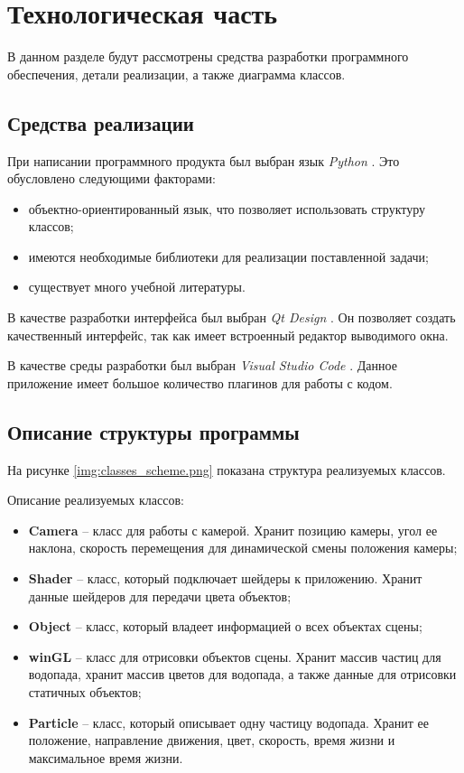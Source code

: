 \chapter{Технологическая часть}

В данном разделе будут рассмотрены средства разработки программного обеспечения, детали реализации, а также диаграмма классов.


\section{Средства реализации}

При написании программного продукта был выбран язык \textit{Python} \cite{python-lang}. Это обусловлено следующими факторами:

\begin{itemize}
    \item объектно-ориентированный язык, что позволяет использовать структуру классов;
    \item имеются необходимые библиотеки для реализации поставленной задачи;
    \item существует много учебной литературы.
\end{itemize}

В качестве разработки интерфейса был выбран \textit{Qt Design} \cite{qt-designer}. Он позволяет создать качественный интерфейс, так как имеет встроенный редактор выводимого окна.

В качестве среды разработки был выбран \textit{Visual Studio Code} \cite{vs-code}. Данное приложение имеет большое количество плагинов для работы с кодом.


\section{Описание структуры программы}

На рисунке \ref{img:classes_scheme.png} показана структура реализуемых классов.


\clearpage

Описание реализуемых классов:

\begin{itemize}
    \item \textbf{Camera} -- класс для работы с камерой. Хранит позицию камеры, угол ее наклона, скорость перемещения для динамической смены положения камеры;
    \item \textbf{Shader} -- класс, который подключает шейдеры к приложению. Хранит данные шейдеров для передачи цвета объектов;
    \item \textbf{Object} -- класс, который владеет информацией о всех объектах сцены;
    \item \textbf{winGL} -- класс для отрисовки объектов сцены. Хранит массив частиц для водопада, хранит массив цветов для водопада, а также данные для отрисовки статичных объектов;
    \item \textbf{Particle} -- класс, который описывает одну частицу водопада. Хранит ее положение, направление движения, цвет, скорость, время жизни и максимальное время жизни. 
\end{itemize}


